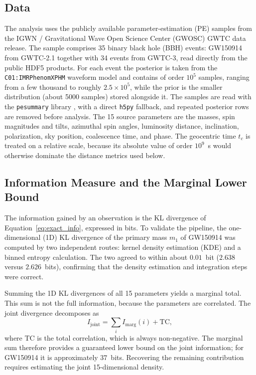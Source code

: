 \documentclass{phys400finalreport}
\begin{document}
\methods\label{sec:methods}

\subsection*{Data}

The analysis uses the publicly available parameter-estimation (PE) samples
from the IGWN / Gravitational Wave Open Science Center (GWOSC) GWTC data
release. The sample comprises 35 binary black hole (BBH) events: GW150914 from
GWTC-2.1 together with 34 events from GWTC-3, read directly from the public
HDF5 products. For each event the posterior is taken from the
\texttt{C01:IMRPhenomXPHM} waveform model and contains of order $10^5$ samples,
ranging from a few thousand to roughly $2.5 \times 10^5$, while the prior is
the smaller distribution (about 5000 samples) stored alongside it. The samples
are read with the \texttt{pesummary} library \citep{Hoy2021}, with a direct
\texttt{h5py} fallback, and repeated posterior rows are removed before
analysis. The 15 source parameters are the masses, spin magnitudes and tilts,
azimuthal spin angles, luminosity distance, inclination, polarization, sky
position, coalescence time, and phase. The geocentric time $t_c$ is treated on
a relative scale, because its absolute value of order $10^9$~s would otherwise
dominate the distance metrics used below.

\subsection*{Information Measure and the Marginal Lower Bound}

The information gained by an observation is the KL divergence of
Equation~\ref{eq:exact_info}, expressed in bits. To validate the pipeline, the
one-dimensional (1D) KL divergence of the primary mass $m_1$ of GW150914 was
computed by two independent routes: kernel density estimation (KDE) and a
binned entropy calculation. The two agreed to within about $0.01$~bit
($2.638$ versus $2.626$~bits), confirming that the density estimation and
integration steps were correct.

Summing the 1D KL divergences of all 15 parameters yields a marginal total.
This sum is not the full information, because the parameters are correlated.
The joint divergence decomposes as
\begin{equation}
I_\mathrm{joint} = \sum_i I_\mathrm{marg}(i) + \mathrm{TC},
\label{eq:tc}
\end{equation}
where $\mathrm{TC}$ is the total correlation, which is always non-negative. The
marginal sum therefore provides a guaranteed lower bound on the joint
information; for GW150914 it is approximately $37$~bits. Recovering the
remaining contribution requires estimating the joint 15-dimensional density.
\end{document}
